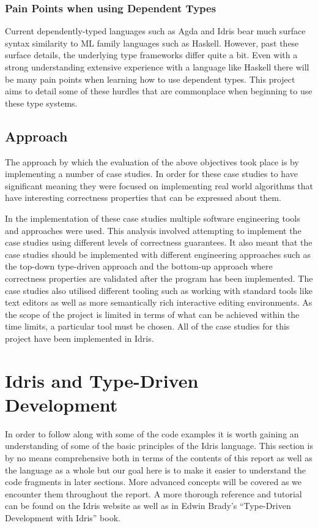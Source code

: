 \documentclass[a4paper, notitlepage]{report}
\begin{document}
\subsection{Pain Points when using Dependent Types}
\label{sec:org11f88cd}
Current dependently-typed languages such as Agda and Idris bear much surface
syntax similarity to ML family languages such as Haskell. However, past these
surface details, the underlying type frameworks differ quite a bit. Even with a
strong understanding extensive experience with a language like Haskell there
will be many pain points when learning how to use dependent types. This project
aims to detail some of these hurdles that are commonplace when beginning to use
these type systems.

\section{Approach}
\label{sec:org524a618}
The approach by which the evaluation of the above objectives took place is by
implementing a number of case studies. In order for these case studies to have
significant meaning they were focused on implementing real world algorithms that
have interesting correctness properties that can be expressed about them.

In the implementation of these case studies multiple software engineering tools
and approaches were used. This analysis involved attempting to implement the
case studies using different levels of correctness guarantees. It also meant
that the case studies should be implemented with different engineering
approaches such as the top-down type-driven approach and the bottom-up approach
where correctness properties are validated after the program has been
implemented. The case studies also utilised different tooling such as working
with standard tools like text editors as well as more semantically rich
interactive editing environments. As the scope of the project is limited in
terms of what can be achieved within the time limits, a particular tool must be
chosen. All of the case studies for this project have been implemented in Idris.
\chapter{Idris and Type-Driven Development}
\label{sec:org161feb9}
In order to follow along with some of the code examples it is worth gaining an
understanding of some of the basic principles of the Idris language. This
section is by no means comprehensive both in terms of the contents of this
report as well as the language as a whole but our goal here is to make it easier
to understand the code fragments in later sections. More advanced concepts will
be covered as we encounter them throughout the report. A more thorough reference
and tutorial can be found on the Idris website \cite{idris_tutorial_2017} as well
as in Edwin Brady's ``Type-Driven Development with Idris'' \cite{brady_book_2017}
book.
\end{document}
